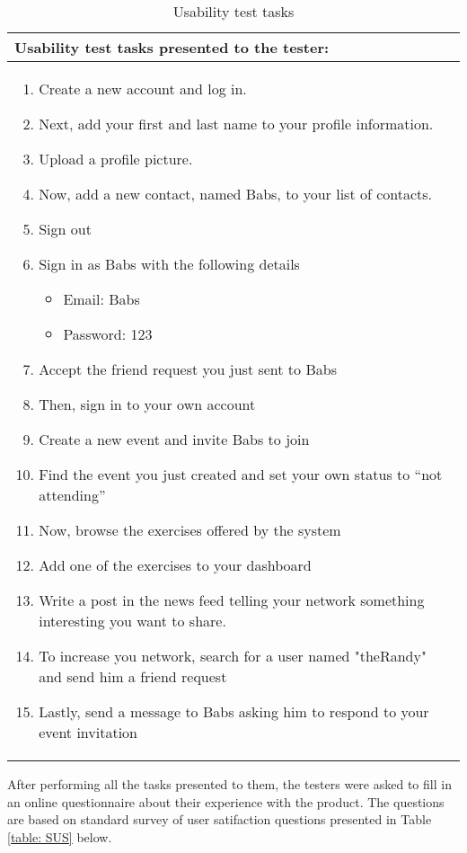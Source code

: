 \begin{table}[H]
\centering
\begin{tabu} to 1.0\textwidth{ |X[l]| } 
\hline {}
Usability test tasks presented to the tester: \\
\hline

\begin{enumerate}
    \item Create a new account and log in.
    \item Next, add your first and last name to your profile information.
    \item Upload a profile picture.
    \item Now, add a new contact, named Babs, to your list of contacts.
    \item Sign out
    \item Sign in as Babs with the following details
        \begin{itemize}
            \item[] Email: Babs
            \item[] Password: 123
        \end{itemize}
    \item Accept the friend request you just sent to Babs
    \item Then, sign in to your own account
    \item Create a new event and invite Babs to join
    \item Find the event you just created and set your own status to “not attending”
    \item Now, browse the exercises offered by the system
    \item Add one of the exercises to your dashboard
    \item Write a post in the news feed telling your network something interesting you want to share.
    \item To increase you network, search for a user named "theRandy" and send him a friend request
    \item Lastly, send a message to Babs asking him to respond to your event invitation 
\end{enumerate}\\
\hline
\end{tabu}
\caption{Usability test tasks}
\label{table: usabilityTasks}
\end{table}

After performing all the tasks presented to them, the testers were asked to fill in an online questionnaire about their experience with the product. The questions are based on standard survey of user satifaction questions presented in Table \ref{table: SUS} below.

